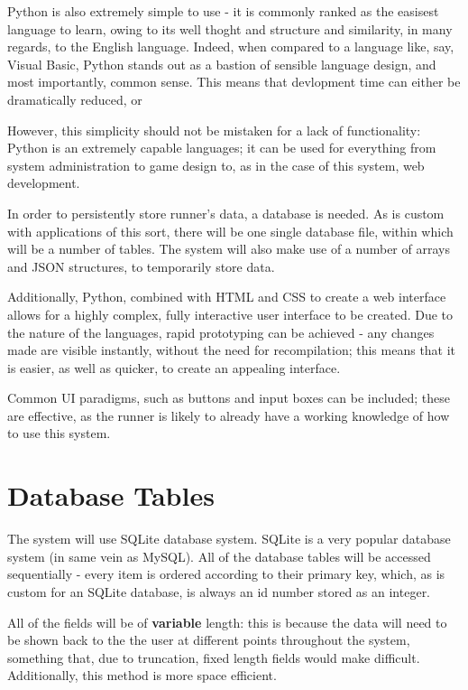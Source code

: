 \documentclass{article}[12pt,a4paper]
\begin{document}
Python is also extremely simple to use - it is commonly ranked as the easisest language to learn, owing to its well thoght and structure and similarity, in many regards, to the English language. Indeed, when compared to a language like, say, Visual Basic, Python stands out as a bastion of sensible language design, and most importantly, common sense. This means that devlopment time can either be dramatically reduced, or 

However, this simplicity should not be mistaken for a lack of functionality: Python is an extremely capable languages; it can be used for everything from system administration to game design to, as in the case of this system, web development.

In order to persistently store runner's data, a database is needed. As is custom with applications of this sort, there will be one single database file, within which will be a number of tables. The system will also make use of a number of arrays and JSON structures, to temporarily store data.

Additionally, Python, combined with HTML and CSS to create a web interface allows for a highly complex, fully interactive user interface to be created. Due to the nature of the languages, rapid prototyping can be achieved - any changes made are visible instantly, without the need for recompilation; this means that it is easier, as well as quicker, to create an appealing interface.

Common UI paradigms, such as buttons and input boxes can be included; these are effective, as the runner is likely to already have a working knowledge of how to use this system. 

\section{Database Tables}
The system will use SQLite database system. SQLite is a very popular database system (in same vein as MySQL). All of the database tables will be accessed sequentially - every item is ordered according to their primary key, which, as is custom for an SQLite database, is always an id number stored as an integer.

All of the fields will be of \textbf{variable} length: this is because the data will need to be shown back to the the user at different points throughout the system, something that, due to truncation, fixed length fields would make difficult. Additionally, this method is more space efficient.
\end{document}
